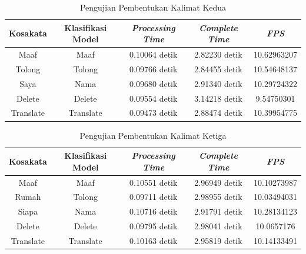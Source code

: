 \begin{longtable}{|c|c|c|c|c|}
  \caption{Pengujian Pembentukan Kalimat Kedua}
  \label{tb:prediksikombinasi2}                                   \\
  \hline
  \rowcolor[HTML]{C0C0C0}
  \textbf{Kosakata} & \textbf{Klasifikasi Model} & \textbf{\emph{Processing Time}} & \textbf{\emph{Complete Time}} & \textbf{\emph{FPS}}\\
  \hline
  Maaf              & Maaf                          & 0.10064 detik                           & 2.82230 detik                                  & 10.62963207\\
  Tolong            & Tolong                        & 0.09766 detik                           & 2.84455 detik                                  & 10.54648137\\
  Saya              & Nama                          & 0.09680 detik                           & 2.91340 detik                                  & 10.29724322\\
  Delete            & Delete                        & 0.09554 detik                           & 3.14218 detik                                  & 9.54750301\\
  Translate         & Translate                     & 0.09473 detik                           & 2.88474 detik                                  & 10.39954775\\
  \hline
\end{longtable}



\begin{longtable}{|c|c|c|c|c|}
  \caption{Pengujian Pembentukan Kalimat Ketiga}
  \label{tb:prediksikombinasi3}                                   \\
  \hline
  \rowcolor[HTML]{C0C0C0}
  \textbf{Kosakata} & \textbf{Klasifikasi Model} & \textbf{\emph{Processing Time}} & \textbf{\emph{Complete Time}} & \textbf{\emph{FPS}}\\
  \hline
  Maaf              & Maaf                          & 0.10551 detik                           & 2.96949 detik                                  & 10.10273987\\
  Rumah             & Tolong                        & 0.09711 detik                           & 2.98955 detik                                  & 10.03494031\\
  Siapa             & Nama                          & 0.10716 detik                           & 2.91791 detik                                  & 10.28134123\\
  Delete            & Delete                        & 0.09795 detik                           & 2.98041 detik                                  & 10.0657176\\
  Translate         & Translate                     & 0.10163 detik                           & 2.95819 detik                                  & 10.14133491\\
  \hline
\end{longtable}


